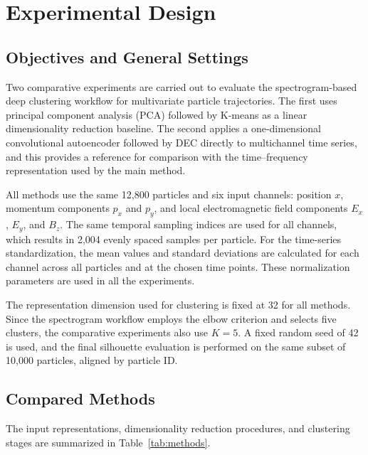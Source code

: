 \section{Experimental Design}\label{sec:experiments}

\subsection{Objectives and General Settings}

Two comparative experiments are carried out to evaluate the spectrogram-based deep clustering workflow for multivariate particle trajectories. The first uses principal component analysis (PCA) followed by K-means as a linear dimensionality reduction baseline. The second applies a one-dimensional convolutional autoencoder followed by DEC directly to multichannel time series, and this provides a reference for comparison with the time--frequency representation used by the main method.

All methods use the same 12,800 particles and six input channels: position \(x\), momentum components \(p_x\) and \(p_y\), and local electromagnetic field components \(E_x\), \(E_y\), and \(B_z\). The same temporal sampling indices are used for all channels, which results in 2,004 evenly spaced samples per particle. For the time-series standardization, the mean values and standard deviations are calculated for each channel across all particles and at the chosen time points. These normalization parameters are used in all the experiments.

The representation dimension used for clustering is fixed at 32 for all methods. Since the spectrogram workflow employs the elbow criterion and selects five clusters, the comparative experiments also use \(K=5\). A fixed random seed of 42 is used, and the final silhouette evaluation is performed on the same subset of 10,000 particles, aligned by particle ID.

\subsection{Compared Methods}

The input representations, dimensionality reduction procedures, and clustering stages are summarized in Table~\ref{tab:methods}.


